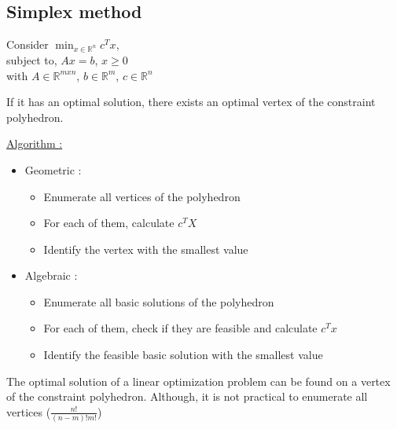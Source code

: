 \documentclass[../main.tex]{subfiles}
\begin{document}
\subsection{Simplex method}
Consider $\min_{x\in \mathbb{R}^n} c^Tx$, \\
subject to, $Ax=b$, $x\geq 0$\\
with $A\in\mathbb{R}^{mxn}$, $b\in \mathbb{R}^m$, $c\in \mathbb{R}^n$\\

\begin{theoremen}
    If it has an optimal solution, there exists an optimal vertex of the constraint polyhedron.
\end{theoremen}

\quad \underline{Algorithm :}\begin{itemize}
    \item Geometric : \begin{itemize}
        \item Enumerate all vertices of the polyhedron\\
        \item For each of them, calculate $c^TX$\\
        \item Identify the vertex with the smallest value\\
    \end{itemize}
    \item Algebraic : \begin{itemize}
        \item Enumerate all basic solutions of the polyhedron\\
        \item For each of them, check if they are feasible and calculate $c^Tx$\\
        \item Identify the feasible basic solution with the smallest value\\
    \end{itemize}
\end{itemize}

The optimal solution of a linear optimization problem can be found on a vertex of the constraint polyhedron. Although, it is not practical to enumerate all vertices ($\frac{n!}{(n-m)!m!}$)\\
\end{document}
